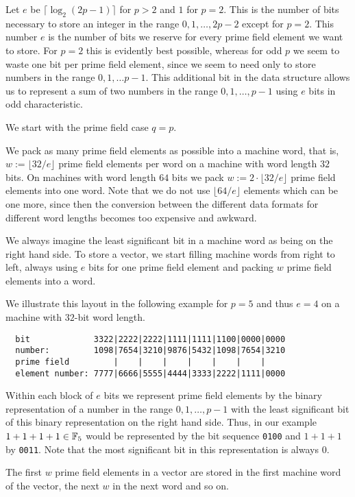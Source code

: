 Let $e$ be $\lceil \log_2(2p-1)\rceil$ for $p > 2$ and $1$ for $p=2$. 
This is the number of bits
necessary to store an integer in the range $0,1, \ldots, 2p-2$ except
for $p=2$. This number $e$ is the number of bits we 
reserve for every prime field element we want to store. For $p=2$ this
is evidently best possible, whereas for odd $p$ we seem to waste
one bit per prime field element, since we seem to need only to store
numbers in the range $0,1,\ldots p-1$. This additional bit in the
data structure allows us to represent a sum of two numbers in the
range $0,1,\ldots, p-1$ using $e$ bits in odd characteristic.

We start with the prime field case $q=p$.

We pack as many prime field elements as possible into a machine
word, that is, $w := \lfloor 32/e \rfloor$ prime field elements per word
on a machine with word length $32$ bits. On machines with word length $64$ bits
we pack $w := 2 \cdot \lfloor 32/e \rfloor$ prime field elements into one word.
Note that we do not use $\lfloor 64/e \rfloor$ elements which can be one
more, since then the conversion between the different data formats for
different word lengths becomes too expensive and awkward.

We always imagine the least significant bit in a machine word as being 
on the right hand side. To store a vector, we start filling machine words 
from right to left, always using $e$ bits for one prime field element and
packing $w$ prime field elements into a word.

We illustrate this layout in the following example for $p=5$ and thus
$e=4$ on a machine with $32$-bit word length.

\begin{verbatim}
  bit             3322|2222|2222|1111|1111|1100|0000|0000
  number:         1098|7654|3210|9876|5432|1098|7654|3210
  prime field         |    |    |    |    |    |    |
  element number: 7777|6666|5555|4444|3333|2222|1111|0000
\end{verbatim}

Within each block of $e$ bits we represent prime field elements
by the binary representation of a number in the range $0,1,\ldots,p-1$
with the least significant bit of this binary representation on the
right hand side. Thus, in our example $1+1+1+1 \in \mathbb{F}_5$ would be
represented by the bit sequence \texttt{0100} and $1+1+1$ by \texttt{0011}.
Note that the most significant bit in this representation is always $0$.

The first $w$ prime field elements in a vector are stored in the first
machine word of the vector, the next $w$ in the next word and so on.


